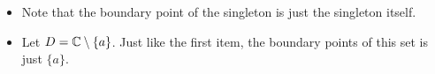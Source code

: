 \documentclass[a4paper]{report}
\begin{document}
\begin{eg}
    \begin{itemize}
  \item  Note that the boundary point of the singleton is just the singleton itself.
    \item Let \( D = \mathbb{C} \setminus  \{ a  \}  \). Just like the first item, the boundary points of this set is just \( \{ a  \}  \). 
    \end{itemize}
\end{eg}

\begin{definition}
    
\end{definition}
\end{document}
